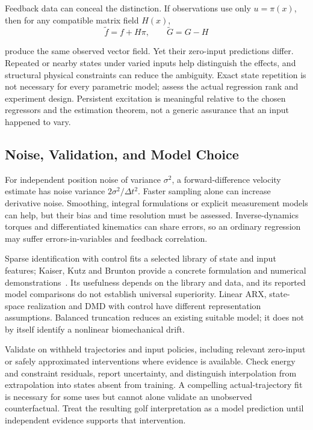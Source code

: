 Feedback data can conceal the distinction. If observations use only $u=\pi(x)$, then for any compatible matrix field $H(x)$,
\begin{equation}
\widetilde f=f+H\pi,\qquad \widetilde G=G-H
\label{eq:ch7:identifiability}
\end{equation}

produce the same observed vector field. Yet their zero-input predictions differ. Repeated or nearby states under varied inputs help distinguish the effects, and structural physical constraints can reduce the ambiguity. Exact state repetition is not necessary for every parametric model; assess the actual regression rank and experiment design. Persistent excitation is meaningful relative to the chosen regressors and the estimation theorem, not a generic assurance that an input happened to vary.

\subsection{Noise, Validation, and Model Choice}
For independent position noise of variance $\sigma^2$, a forward-difference velocity estimate has noise variance $2\sigma^2/\Delta t^2$. Faster sampling alone can increase derivative noise. Smoothing, integral formulations or explicit measurement models can help, but their bias and time resolution must be assessed. Inverse-dynamics torques and differentiated kinematics can share errors, so an ordinary regression may suffer errors-in-variables and feedback correlation.

Sparse identification with control fits a selected library of state and input features; Kaiser, Kutz and Brunton provide a concrete formulation and numerical demonstrations~\cite{KaiserKutzBrunton2018}. Its usefulness depends on the library and data, and its reported model comparisons do not establish universal superiority. Linear ARX, state-space realization and DMD with control have different representation assumptions. Balanced truncation reduces an existing suitable model; it does not by itself identify a nonlinear biomechanical drift.

Validate on withheld trajectories and input policies, including relevant zero-input or safely approximated interventions where evidence is available. Check energy and constraint residuals, report uncertainty, and distinguish interpolation from extrapolation into states absent from training. A compelling actual-trajectory fit is necessary for some uses but cannot alone validate an unobserved counterfactual. Treat the resulting golf interpretation as a model prediction until independent evidence supports that intervention.

